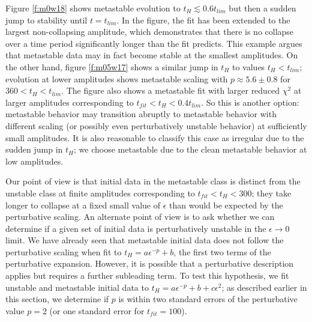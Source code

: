 \documentclass[../PhD.tex]{subfiles}
\begin{document}
Figure \ref{f:m0w18} shows metastable evolution to $t_H\lesssim 0.6t_{lim}$
but then a sudden jump to stability until $t=t_{lim}$.  In the figure, the
fit has been extended to the largest non-collapsing amplitude,
which demonstrates that
there is no collapse over a time period significantly longer than the fit
predicts. This example argues that metastable data
may in fact become stable at the smallest amplitudes.  On the other hand,
figure \ref{f:m05w17} shows a similar jump in $t_H$ to values $t_H<t_{lim}$;
evolution at lower amplitudes shows metastable scaling with
$p\approx 5.6\pm 0.8$ 
for $360<t_H<t_{lim}$.  The figure also shows a metastable fit 
with larger reduced $\chi^2$ at
larger amplitudes corresponding to $t_{fit}<t_H<0.4 t_{lim}$.
So this is another option: metastable behavior
may transition abruptly to metastable behavior with different scaling
(or possibly even perturbatively unstable behavior) at sufficiently
small amplitudes. It is also reasonable to classify this case as irregular
due to the sudden jump in $t_H$; we choose metastable due to the clean 
metastable behavior at low amplitudes.

Our point of view is that initial data in the metastable class is distinct
from the unstable class at finite amplitudes corresponding to $t_{fit}<t_H<300$; 
they take longer to collapse
at a fixed small value of $\epsilon$ than would be expected by the perturbative
scaling. An alternate point of view is to ask whether we can determine if
a given set of initial data is perturbatively unstable in the $\epsilon\to 0$
limit. We have already seen that metastable initial data does not follow
the perturbative scaling when fit to $t_H=a\epsilon^{-p}+b$, the first
two terms of the perturbative expansion. However, it is possible that a
perturbative description applies but requires a further subleading term.
To test this hypothesis, we fit unstable and metastable initial data to
$t_H=a\epsilon^{-p}+b+c\epsilon^2$; as described earlier in this section,
we determine if $p$ is within two standard errors of the perturbative value
$p=2$ (or one standard error for $t_{fit}=100$). 
\end{document}
